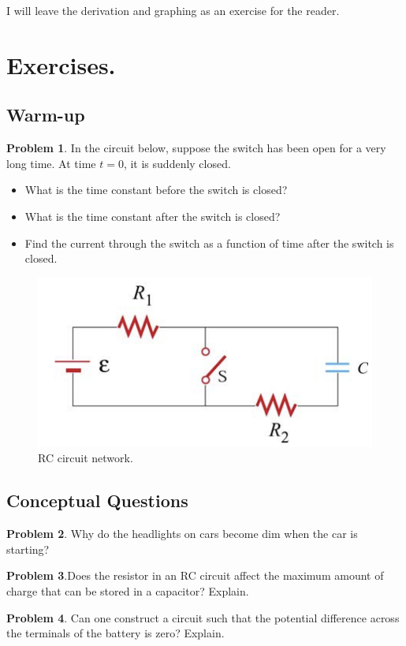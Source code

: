 \documentclass[11pt, letterpaper]{article}
\begin{document}
I will leave the derivation and graphing as an exercise for the reader.

\section{Exercises.}
\subsection{Warm-up}
\textbf{Problem 1}. In the circuit below, suppose the switch has been open for a very long time. At time $t = 0$, it is suddenly closed.

\begin{itemize}
	\item What is the time constant before the switch is closed?
	\item What is the time constant after the switch is closed?
	\item Find the current through the switch as a function of time after the switch is closed.
\end{itemize}
\begin{figure}[h!]
	\centering
	\includegraphics[scale=0.5]{p1}
	\caption{RC circuit network.}
	\label{fig:p1}
\end{figure}

\subsection{Conceptual Questions}
\textbf{Problem 2}. Why do the headlights on cars become dim when the car is starting?

\textbf{Problem 3}.Does the resistor in an RC circuit affect the maximum amount of charge that can be stored in a capacitor? Explain.

\textbf{Problem 4}. Can one construct a circuit such that the potential difference across the terminals of the battery is zero? Explain.
\newpage
\end{document}
